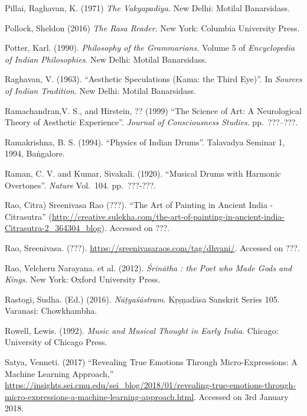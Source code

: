 \begin{thebibliography}{99}
Pillai, Raghavan, K. (1971) \textsl{The Vakyapadiya}. New Delhi: Motilal Banarsidass.

Pollock, Sheldon (2016) \textsl{The Rasa Reader}. New York: Columbia University Press.

Potter, Karl. (1990). \textsl{Philosophy of the Grammarians.} Volume 5 of \textsl{Encyclopedia of Indian Philosophies}. New Delhi: Motilal Banarsidass.

Raghavan, V. (1963). “Aesthetic Speculations (Kama: the Third Eye)”. In \textsl{Sources of Indian Tradition}. New Delhi: Motilal Banarsidass.

Ramachandran,V. S., and Hirstein, ?? (1999) “The Science of Art: A Neurological Theory of Aesthetic Experience”. \textsl{Journal of Consciousness Studies}. pp.~???--???.

Ramakrishna, B. S. (1994). “Physics of Indian Drums”. Talavadya Seminar 1, 1994, Baṅgalore.

Raman, C. V. and Kumar, Sivakali. (1920). “Musical Drums with Harmonic Overtones”. \textsl{Nature} Vol.~104. pp.~???-???.

Rao, Citra) Sreenivasa Rao (???). “The Art of Painting in Ancient India - Citrasutra” (\url{http://creative.sulekha.com/the-art-of-painting-in-ancient-india-Citrasutra-2_364304_blog}). Accessed on ???.

Rao, Sreenivasa. (???). \url{https://sreenivasaraos.com/tag/dhvani/}. Accessed on ???.

Rao, Velcheru Narayana. et al. (2012). \textsl{Śrīnātha : the Poet who Made Gods and Kings}. New York: Oxford University Press.

Rastogi, Sudha. (Ed.) (2016). \textsl{Nāṭyaśāstram}. Kṛṣṇadāsa Sanskrit Series 105. Varanasi: Chowkhambha.

Rowell, Lewis. (1992). \textsl{Music and Musical Thought in Early India}. Chicago: University of Chicago Press.

Satya, Venneti. (2017) “Revealing True Emotions Through Micro-Expressions: A Machine Learning Approach,” \url{https://insights.sei.cmu.edu/sei_blog/2018/01/revealing-true-emotions-through-micro-expressions-a-machine-learning-approach.html}. Accessed on 3rd January 2018.


\end{thebibliography}
